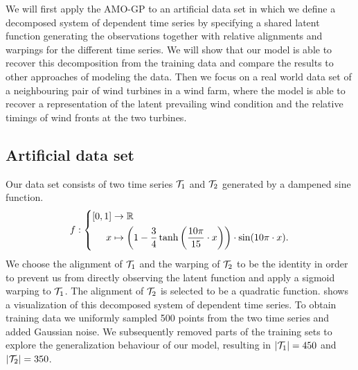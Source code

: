 We will first apply the AMO-GP to an artificial data set in which we define a decomposed system of dependent time series by specifying a shared latent function generating the observations together with relative alignments and warpings for the different time series.
We will show that our model is able to recover this decomposition from the training data and compare the results to other approaches of modeling the data.
Then we focus on a real world data set of a neighbouring pair of wind turbines in a wind farm, where the model is able to recover a representation of the latent prevailing wind condition and the relative timings of wind fronts at the two turbines.

\subsection{Artificial data set}
\label{sub:timeseries_alignment:artificial_example}
Our data set consists of two time series $\mathcal{T}_1$ and $\mathcal{T}_2$ generated by a dampened sine function.
\begin{align}
    f : \left\{ \begin{aligned}
        [0, 1] & \to \Rb                                                                                                          \\
        x      & \mapsto \left( 1 - \frac{3}{4} \tanh \left( \frac{10\pi}{15} \cdot x \right) \right) \cdot \sin (10\pi \cdot x).
    \end{aligned}\right.
\end{align}
We choose the alignment of $\mathcal{T}_1$ and the warping of $\mathcal{T}_2$ to be the identity in order to prevent us from directly observing the latent function and apply a sigmoid warping to $\mathcal{T}_1$.
The alignment of $\mathcal{T}_2$ is selected to be a quadratic function.
 shows a visualization of this decomposed system of dependent time series.
To obtain training data we uniformly sampled 500 points from the two time series and added Gaussian noise.
We subsequently removed parts of the training sets to explore the generalization behaviour of our model, resulting in $\vert\mathcal{T}_1\vert= 450$ and $\vert\mathcal{T}_2\vert = 350$.

